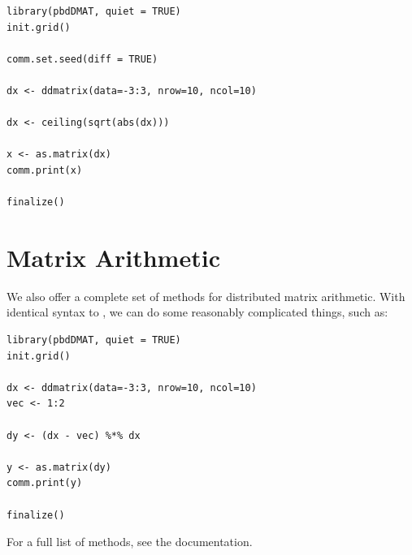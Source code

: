 \begin{lstlisting}[language=rr,title=Transformations]
library(pbdDMAT, quiet = TRUE)
init.grid()

comm.set.seed(diff = TRUE)

dx <- ddmatrix(data=-3:3, nrow=10, ncol=10)

dx <- ceiling(sqrt(abs(dx)))

x <- as.matrix(dx)
comm.print(x)

finalize()
\end{lstlisting}





\section{Matrix Arithmetic}

We also offer a complete set of methods for distributed matrix arithmetic.  With identical syntax to , we can do some reasonably complicated things, such as:

\begin{lstlisting}[language=rr,title=Transformations]
library(pbdDMAT, quiet = TRUE)
init.grid()

dx <- ddmatrix(data=-3:3, nrow=10, ncol=10)
vec <- 1:2

dy <- (dx - vec) %*% dx

y <- as.matrix(dy)
comm.print(y)

finalize()
\end{lstlisting}

For a full list of methods, see the  documentation.


